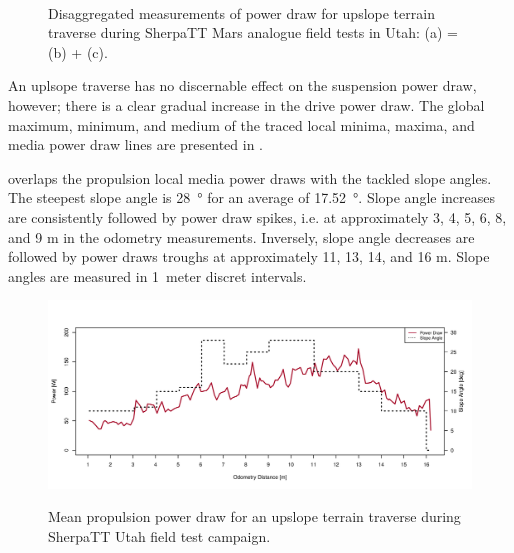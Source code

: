 \begin{figure}[h]
\begin{subfigure}[t]{\subfigureWidth}
		\label{fig:plot:sub:sherpatt-disaggregated-upslope-terrain-power-draw-suspension}
	\end{subfigure}\\[0.8ex]
    \caption[Disaggregated measurements of power draw for upslope terrain traverse]
            {Disaggregated measurements of power draw for upslope terrain traverse during SherpaTT Mars analogue field tests in Utah: (a) = (b) + (c).}
    \label{fig:plot:sherpatt-disaggregated-upslope-terrain-power-draw}
\vspace{-2ex}
\end{figure}

\vspace{0.5cm}

An uplsope traverse has no discernable effect on the suspension power draw, however; there is a clear gradual increase in the drive power draw. The global maximum, minimum, and medium of the traced local minima, maxima, and media power draw lines are presented in .

\clearpage


 overlaps the propulsion local media power draws with the tackled slope angles. The steepest slope angle is \SI{28}{\degree} for an average of \SI{17.52}{\degree}. Slope angle increases are consistently followed by power draw spikes, i.e. at approximately 3, 4, 5, 6, 8, and 9 \si{\meter} in the odometry measurements. Inversely, slope angle decreases are followed by power draws troughs at approximately 11, 13, 14, and 16 \si{\meter}. Slope angles are measured in \SI{1}{meter} discret intervals.

\begin{figure}[h]
  \centering
  \hypersetup{linkcolor=captionTextColor}
  \includegraphics[width=0.8\linewidth]{sections/design/power-budget/plots/minima-locomotion-power-draws-on-upslope-terrain.png}\\
  \caption[Mean propulsion power draw for an upslope terrain traverse]
          {Mean propulsion power draw for an upslope terrain traverse during SherpaTT Utah field test campaign.}
  \label{fig:plot:sherpatt-upslope-terrain-power-draw}
\end{figure}


